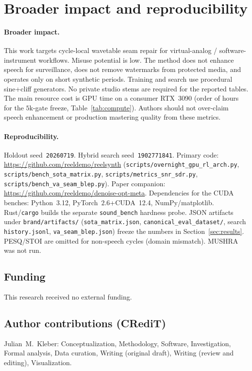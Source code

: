 \section{Broader impact and reproducibility}
\label{sec:ethics}

\paragraph{Broader impact.}
This work targets cycle-local wavetable seam repair for virtual-analog / software-instrument workflows.
Misuse potential is low. The method does not enhance speech for surveillance, does not remove watermarks from protected media, and operates only on short synthetic periods.
Training and search use procedural sine{+}cliff generators. No private studio stems are required for the reported tables.
The main resource cost is GPU time on a consumer RTX~3090 (order of hours for the $5$k-gate freeze, Table~\ref{tab:compute}).
Authors should not over-claim speech enhancement or production mastering quality from these metrics.

\paragraph{Reproducibility.}
Holdout seed~\texttt{20260719}. Hybrid search seed~\texttt{1902771841}.
Primary code: \url{https://github.com/reeldemo/reelsynth} (\texttt{scripts/overnight\_gpu\_rl\_arch.py}, \texttt{scripts/bench\_sota\_matrix.py}, \texttt{scripts/metrics\_snr\_sdr.py}, \texttt{scripts/bench\_va\_seam\_blep.py}).
Paper companion: \url{https://github.com/reeldemo/denoise-opt-meta}.
Dependencies for the CUDA benches: Python~3.12, PyTorch~$2.6$+CUDA~12.4, NumPy/matplotlib. Rust/\texttt{cargo} builds the separate \texttt{sound\_bench} hardness probe.
JSON artifacts under \texttt{brand/artifacts/} (\texttt{sota\_matrix.json}, \texttt{canonical\_eval\_dataset/}, search \texttt{history.jsonl}, \texttt{va\_seam\_blep.json}) freeze the numbers in Section~\ref{sec:results}.
PESQ/STOI are omitted for non-speech cycles (domain mismatch). MUSHRA was not run.

\subsection{Funding}
\label{sec:funding}
This research received no external funding.

\subsection{Author contributions (CRediT)}
\label{sec:credit}
Julian~M.~Kleber: Conceptualization, Methodology, Software, Investigation, Formal analysis, Data curation, Writing (original draft), Writing (review and editing), Visualization.

